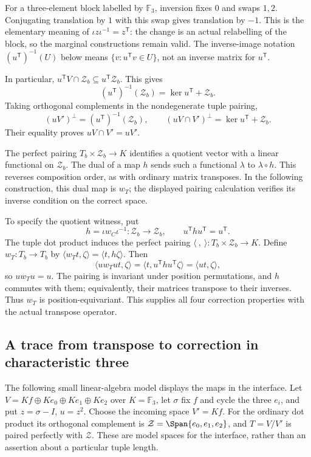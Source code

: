 For a three-element block labelled by $\mathbb F_3$, inversion fixes
$0$ and swaps $1,2$. Conjugating translation by $1$ with this swap
gives translation by $-1$. This is the elementary meaning of
$\iota z\iota^{-1}=z^{\mathsf T}$: the change is an actual
relabelling of the block, so the marginal constructions remain valid.
The inverse-image notation $(u^{\mathsf T})^{-1}(U)$ below means
$\{v:u^{\mathsf T}v\in U\}$, not an inverse matrix for $u^{\mathsf T}$.

In particular,
$u^{\mathsf T}V\cap\mathcal Z_b\subseteq
u^{\mathsf T}\mathcal Z_b$. This gives
\[
 (u^{\mathsf T})^{-1}(\mathcal Z_b)
                   =\ker u^{\mathsf T}+\mathcal Z_b.
\]
Taking orthogonal complements in the nondegenerate tuple pairing,
\[
 (uV')^\perp=(u^{\mathsf T})^{-1}(\mathcal Z_b),\qquad
 (uV\cap V')^\perp=\ker u^{\mathsf T}+\mathcal Z_b.
\]
Their equality proves $uV\cap V'=uV'$.

The perfect pairing $T_b\times\mathcal Z_b\to K$ identifies a
quotient vector with a linear functional on $\mathcal Z_b$.
The dual of a map $h$ sends such a functional $\lambda$ to
$\lambda\circ h$. This reverses composition order, as with ordinary
matrix transposes. In the following construction, this dual map is
$w_T$; the displayed pairing calculation verifies its inverse
condition on the correct space.

To specify the quotient witness, put
\[
 h=\iota w_C\iota^{-1}:\mathcal Z_b\longrightarrow\mathcal Z_b,
                  \qquad u^{\mathsf T}hu^{\mathsf T}=u^{\mathsf T}.
\]
The tuple dot product induces the perfect pairing
$\langle\ ,\ \rangle:T_b\times\mathcal Z_b\to K$.
Define $w_T:T_b\to T_b$ by
$\langle w_Tt,\zeta\rangle=\langle t,h\zeta\rangle$.
Then
\[
 \langle uw_Tut,\zeta\rangle
 =\langle t,u^{\mathsf T}hu^{\mathsf T}\zeta\rangle
 =\langle ut,\zeta\rangle,
\]
so $uw_Tu=u$. The pairing is invariant under position permutations,
and $h$ commutes with them; equivalently, their matrices transpose to
their inverses. Thus $w_T$ is position-equivariant. This supplies all
four correction properties with the actual transpose operator.

\subsection{A trace from transpose to correction in characteristic three}
The following small linear-algebra model displays the maps in the
interface. Let $V=Kf\oplus Ke_0\oplus Ke_1\oplus Ke_2$ over
$K=\mathbb F_3$, let $\sigma$ fix $f$ and cycle the three $e_i$, and
put $z=\sigma-I$, $u=z^2$. Choose the incoming space $V'=Kf$.
For the ordinary dot product its orthogonal complement is
$\mathcal Z=\Span\{e_0,e_1,e_2\}$, and $T=V/V'$ is paired perfectly
with $\mathcal Z$. These are model spaces for the interface, rather
than an assertion about a particular tuple length.

